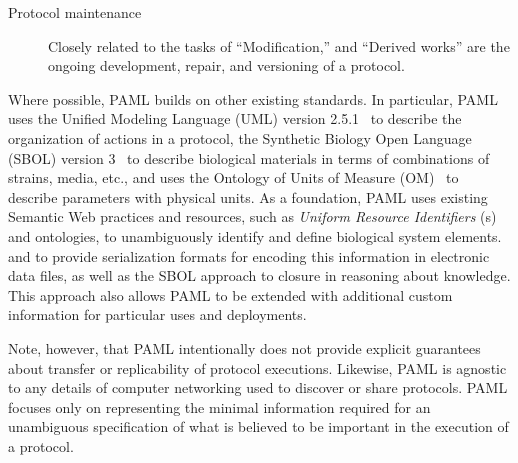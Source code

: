 \begin{description}
\item[Protocol maintenance] Closely related to the tasks of ``Modification,'' and ``Derived works'' are the ongoing development, repair, and versioning of a protocol.

\end{description}

Where possible, PAML builds on other existing standards.
In particular, PAML uses the Unified Modeling Language (UML) version 2.5.1~\citep{uml251} to describe the organization of actions in a protocol, the Synthetic Biology Open Language (SBOL) version 3~\citep{SBOL3} to describe biological materials in terms of combinations of strains, media, etc., and uses the Ontology of Units of Measure (OM)~\citep{om2} to describe parameters with physical units.
As a foundation, PAML uses existing Semantic Web practices and resources, such as \emph{Uniform Resource Identifiers} (s) and ontologies, to unambiguously identify and define biological system elements.
and to provide serialization formats for encoding this information in electronic data files, as well as the SBOL approach to closure in reasoning about knowledge.
This approach also allows PAML to be extended with additional custom information for particular uses and deployments.

Note, however, that PAML intentionally does not provide explicit guarantees about transfer or replicability of protocol executions. 
Likewise, PAML is agnostic to any details of computer networking used to discover or share protocols.
PAML focuses only on representing the minimal information required for an unambiguous specification of what is believed to be important in the execution of a protocol.


